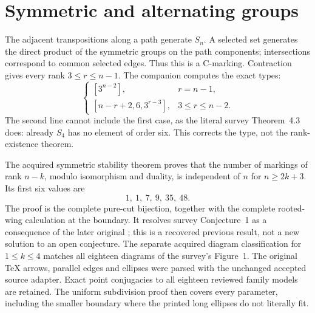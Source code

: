 \documentclass[11pt]{article}
\newcommand{\note}[1]{\marginpar{\raggedright\scriptsize #1}}
\begin{document}
\section{Symmetric and alternating groups}
The adjacent transpositions along a path generate $S_n$. A selected
set generates the direct product of the symmetric groups on the path
components; intersections correspond to common selected edges. Thus
this is a C-marking. Contraction gives every rank $3\le r\le n-1$.
The companion computes the exact types:
\[
 \begin{cases}
 [3^{n-2}],&r=n-1,\\
 [n-r+2,6,3^{r-3}],&3\le r\le n-2.
 \end{cases}                                                    \tag{1}
\]
\note{Correction}
The second line cannot include the first case, as the literal survey
Theorem~4.3 does: already $S_4$ has no element of order six.
This corrects the type, not the rank-existence theorem.

The acquired symmetric stability theorem proves that the number of
markings of rank $n-k$, modulo isomorphism and duality, is independent
of $n$ for $n\ge2k+3$. Its first six values are
\[
                           1,\ 1,\ 7,\ 9,\ 35,\ 48.           \tag{2}
\]
The proof is the complete pure-cut bijection, together with the
complete rooted-wing calculation at the boundary. It resolves survey
Conjecture~1 as a consequence of the later original \cite{stability};
this is a recovered previous result, not a new solution to an open
conjecture. The separate acquired diagram classification for
$1\le k\le4$ matches all eighteen diagrams of the survey's Figure~1.
The original TeX arrows, parallel edges and ellipses were parsed with
the unchanged accepted source adapter. Exact point conjugacies to all
eighteen reviewed family models are retained. The uniform subdivision
proof then covers every parameter, including the smaller boundary
where the printed long ellipses do not literally fit.
\end{document}
